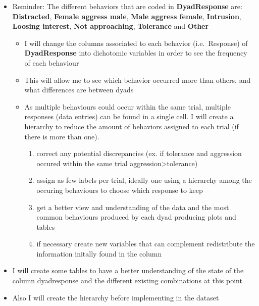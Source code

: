 \documentclass[
]{article}
\providecommand{\tightlist}{%
  \setlength{\itemsep}{0pt}\setlength{\parskip}{0pt}}
\begin{document}
\begin{itemize}
\item
  Reminder: The different behaviors that are coded in
  \textbf{DyadResponse} are: \textbf{Distracted}, \textbf{Female aggress
  male}, \textbf{Male aggress female}, \textbf{Intrusion},
  \textbf{Loosing interest}, \textbf{Not approaching},
  \textbf{Tolerance} and \textbf{Other}

  \begin{itemize}
  \tightlist
  \item
    I will change the columns associated to each behavior
    (i.e.~Response) of \textbf{DyadResponse} into dichotomic variables
    in order to see the frequency of each behaviour
  \item
    This will allow me to see which behavior occurred more than others,
    and what differences are between dyads
  \item
    As multiple behaviours could occur within the same trial, multiple
    responses (data entries) can be found in a single cell. I will
    create a hierarchy to reduce the amount of behaviors assigned to
    each trial (if there is more than one).

    \begin{enumerate}
    \def\labelenumi{\arabic{enumi}.}
    \tightlist
    \item
      correct any potential discrepancies (ex. if tolerance and
      aggression occured within the same trial
      aggression\textgreater tolerance)
    \item
      assign as few labels per trial, ideally one using a hierarchy
      among the occuring behaviours to choose which response to keep
    \item
      get a better view and understanding of the data and the most
      common behaviours produced by each dyad producing plots and tables
    \item
      if necessary create new variables that can complement redistribute
      the information initally found in the column
    \end{enumerate}
  \end{itemize}
\item
  I will create some tables to have a better understanding of the state
  of the column dyadresponse and the different existing combinations at
  this point
\item
  Also I will create the hierarchy before implementing in the dataset
\end{itemize}
\end{document}
